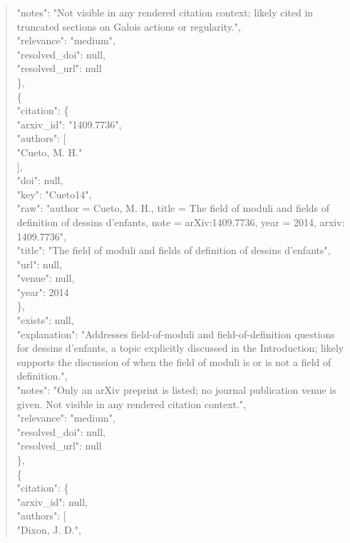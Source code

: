\documentclass[11pt]{article}
\begin{document}
\begin{quote}
      "notes": "Not visible in any rendered citation context; likely cited in truncated sections on Galois actions or regularity.",\\
      "relevance": "medium",\\
      "resolved\_doi": null,\\
      "resolved\_url": null\\
    \},\\
    \{\\
      "citation": \{\\
        "arxiv\_id": "1409.7736",\\
        "authors": [\\
          "Cueto, M. H."\\
        ],\\
        "doi": null,\\
        "key": "Cueto14",\\
        "raw": "author = Cueto, M. H., title = The field of moduli and fields of definition of dessins d'enfants, note = arXiv:1409.7736, year = 2014, arxiv: 1409.7736",\\
        "title": "The field of moduli and fields of definition of dessins d'enfants",\\
        "url": null,\\
        "venue": null,\\
        "year": 2014\\
      \},\\
      "exists": null,\\
      "explanation": "Addresses field-of-moduli and field-of-definition questions for dessins d'enfants, a topic explicitly discussed in the Introduction; likely supports the discussion of when the field of moduli is or is not a field of definition.",\\
      "notes": "Only an arXiv preprint is listed; no journal publication venue is given. Not visible in any rendered citation context.",\\
      "relevance": "medium",\\
      "resolved\_doi": null,\\
      "resolved\_url": null\\
    \},\\
    \{\\
      "citation": \{\\
        "arxiv\_id": null,\\
        "authors": [\\
          "Dixon, J. D.",\\

\end{quote}
\end{document}
